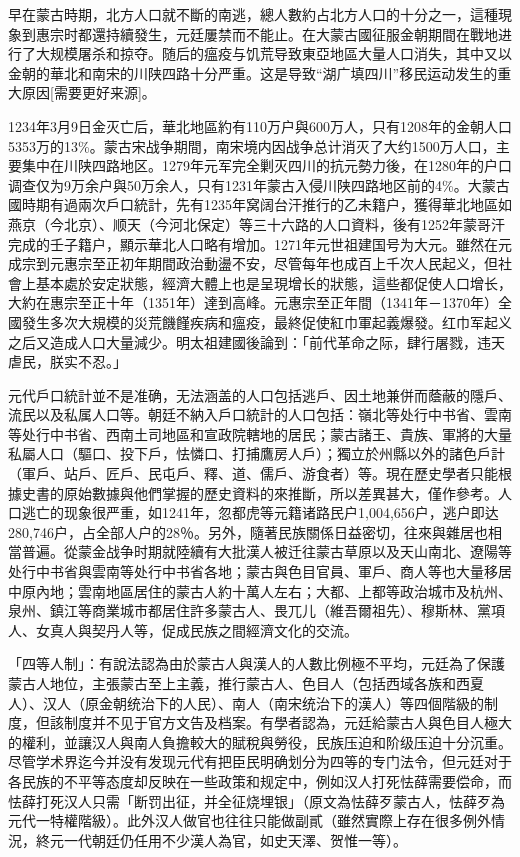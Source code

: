 早在蒙古時期，北方人口就不斷的南逃，總人數約占北方人口的十分之一，這種現象到惠宗时都還持續發生，元廷屢禁而不能止。在大蒙古國征服金朝期間在戰地进行了大规模屠杀和掠夺。随后的瘟疫与饥荒导致東亞地區大量人口消失，其中又以金朝的華北和南宋的川陕四路十分严重。这是导致“湖广填四川”移民运动发生的重大原因[需要更好来源]。

1234年3月9日金灭亡后，華北地區約有110万户與600万人，只有1208年的金朝人口5353万的13\%。蒙古宋战争期間，南宋境内因战争总计消灭了大约1500万人口，主要集中在川陕四路地区。1279年元军完全剿灭四川的抗元勢力後，在1280年的户口调查仅为9万余户與50万余人，只有1231年蒙古入侵川陕四路地区前的4\%。大蒙古國時期有過兩次戶口統計，先有1235年窝阔台汗推行的乙未籍户，獲得華北地區如燕京（今北京）、顺天（今河北保定）等三十六路的人口資料，後有1252年蒙哥汗完成的壬子籍户，顯示華北人口略有增加。1271年元世祖建国号为大元。雖然在元成宗到元惠宗至正初年期間政治動盪不安，尽管每年也成百上千次人民起义，但社會上基本處於安定狀態，經濟大體上也是呈現增长的狀態，這些都促使人口增长，大約在惠宗至正十年（1351年）達到高峰。元惠宗至正年間（1341年－1370年）全國發生多次大規模的災荒饑饉疾病和瘟疫，最終促使紅巾軍起義爆發。红巾军起义之后又造成人口大量減少。明太祖建國後論到：「前代革命之际，肆行屠戮，违天虐民，朕实不忍。」

元代戶口統計並不是准确，无法涵盖的人口包括逃戶、因土地兼併而蔭蔽的隱戶、流民以及私属人口等。朝廷不納入戶口統計的人口包括：嶺北等处行中书省、雲南等处行中书省、西南土司地區和宣政院轄地的居民；蒙古諸王、貴族、軍將的大量私屬人口（驅口、投下戶，怯憐口、打捕鷹房人戶）；獨立於州縣以外的諸色戶計（軍戶、站戶、匠戶、民屯戶、釋、道、儒戶、游食者）等。現在歷史學者只能根據史書的原始數據與他們掌握的歷史資料的來推斷，所以差異甚大，僅作參考。人口逃亡的现象很严重，如1241年，忽都虎等元籍诸路民户1,004,656户，逃户即达280,746户，占全部人户的28％。另外，隨著民族關係日益密切，往來與雜居也相當普遍。從蒙金战争时期就陸續有大批漢人被迁往蒙古草原以及天山南北、遼陽等处行中书省與雲南等处行中书省各地；蒙古與色目官員、軍戶、商人等也大量移居中原內地；雲南地區居住的蒙古人約十萬人左右；大都、上都等政治城市及杭州、泉州、鎮江等商業城市都居住許多蒙古人、畏兀儿（維吾爾祖先）、穆斯林、黨項人、女真人與契丹人等，促成民族之間經濟文化的交流。

「四等人制」：有說法認為由於蒙古人與漢人的人數比例極不平均，元廷為了保護蒙古人地位，主張蒙古至上主義，推行蒙古人、色目人（包括西域各族和西夏人）、汉人（原金朝统治下的人民）、南人（南宋统治下的漢人）等四個階級的制度，但該制度并不见于官方文告及档案。有學者認為，元廷給蒙古人與色目人極大的權利，並讓汉人與南人負擔較大的賦稅與勞役，民族压迫和阶级压迫十分沉重。尽管学术界迄今并没有发现元代有把臣民明确划分为四等的专门法令，但元廷对于各民族的不平等态度却反映在一些政策和规定中，例如汉人打死怯薛需要偿命，而怯薛打死汉人只需「断罚出征，并全征烧埋银」（原文為怯薛歹蒙古人，怯薛歹為元代一特權階級）。此外汉人做官也往往只能做副貳（雖然實際上存在很多例外情況，終元一代朝廷仍任用不少漢人為官，如史天澤、贺惟一等）。

